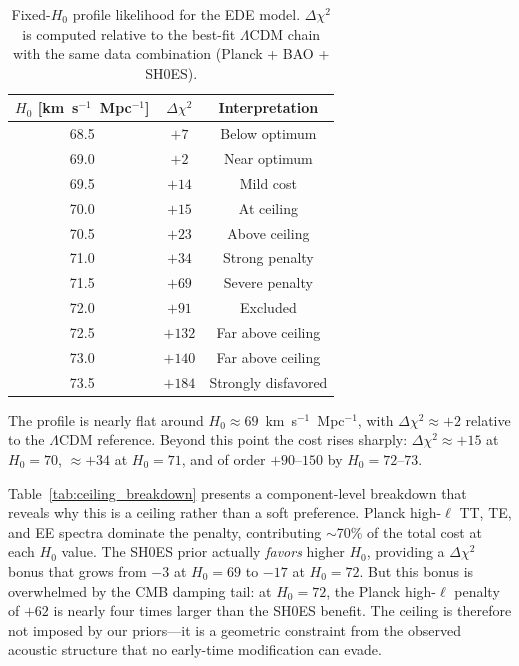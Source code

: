 \documentclass[a4paper,11pt]{article}
\begin{document}
\begin{table}[ht]
\centering
\caption{Fixed-$H_0$ profile likelihood for the EDE model. $\Delta\chi^2$ is computed relative to the best-fit $\Lambda$CDM chain with the same data combination (Planck + BAO + SH0ES).}
\label{tab:h0_ceiling}
\begin{tabular}{ccc}
\toprule
$H_0$ [km~s$^{-1}$~Mpc$^{-1}$] & $\Delta\chi^2$ & Interpretation \\
\midrule
68.5 & $+7$ & Below optimum \\
69.0 & $+2$ & Near optimum \\
69.5 & $+14$ & Mild cost \\
70.0 & $+15$ & At ceiling \\
70.5 & $+23$ & Above ceiling \\
71.0 & $+34$ & Strong penalty \\
71.5 & $+69$ & Severe penalty \\
72.0 & $+91$ & Excluded \\
72.5 & $+132$ & Far above ceiling \\
73.0 & $+140$ & Far above ceiling \\
73.5 & $+184$ & Strongly disfavored \\
\bottomrule
\end{tabular}
\end{table}

The profile is nearly flat around $H_0 \approx 69$~km~s$^{-1}$~Mpc$^{-1}$, with $\Delta\chi^2 \approx +2$ relative to the $\Lambda$CDM reference. Beyond this point the cost rises sharply: $\Delta\chi^2 \approx +15$ at $H_0 = 70$, $\approx +34$ at $H_0 = 71$, and of order $+90$--$150$ by $H_0 = 72$--$73$. 

Table~\ref{tab:ceiling_breakdown} presents a component-level breakdown that reveals why this is a ceiling rather than a soft preference. Planck high-$\ell$ TT, TE, and EE spectra dominate the penalty, contributing $\sim$70\% of the total cost at each $H_0$ value. The SH0ES prior actually \emph{favors} higher $H_0$, providing a $\Delta\chi^2$ bonus that grows from $-3$ at $H_0 = 69$ to $-17$ at $H_0 = 72$. But this bonus is overwhelmed by the CMB damping tail: at $H_0 = 72$, the Planck high-$\ell$ penalty of $+62$ is nearly four times larger than the SH0ES benefit. The ceiling is therefore not imposed by our priors---it is a geometric constraint from the observed acoustic structure that no early-time modification can evade.
\end{document}
